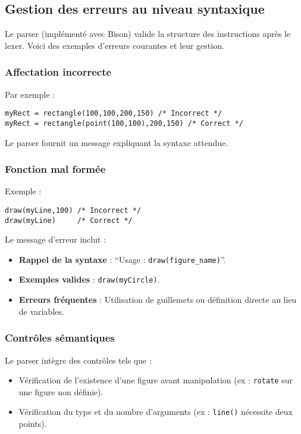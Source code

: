 \documentclass[12pt,a4paper]{article}
\begin{document}
\subsection{Gestion des erreurs au niveau syntaxique}
Le parser (implémenté avec Bison) valide la structure des instructions après le lexer. Voici des exemples d’erreurs courantes et leur gestion.

\subsubsection{Affectation incorrecte}
Par exemple :
\begin{verbatim}
myRect = rectangle(100,100,200,150) /* Incorrect */
myRect = rectangle(point(100,100),200,150) /* Correct */
\end{verbatim}

Le parser fournit un message expliquant la syntaxe attendue.

\subsubsection{Fonction mal formée}
Exemple :
\begin{verbatim}
draw(myLine,100) /* Incorrect */
draw(myLine)     /* Correct */
\end{verbatim}

Le message d’erreur inclut :
\begin{itemize}
    \item \textbf{Rappel de la syntaxe} : ``Usage : \texttt{draw(figure\_name)}''.
    \item \textbf{Exemples valides} : \texttt{draw(myCircle)}.
    \item \textbf{Erreurs fréquentes} : Utilisation de guillemets ou définition directe au lieu de variables.
\end{itemize}

\subsubsection{Contrôles sémantiques}
Le parser intègre des contrôles tels que :
\begin{itemize}
    \item Vérification de l’existence d’une figure avant manipulation (ex : \texttt{rotate} sur une figure non définie).
    \item Vérification du type et du nombre d’arguments (ex : \texttt{line()} nécessite deux points).
\end{itemize}
\end{document}
